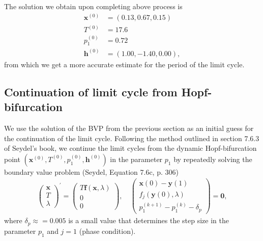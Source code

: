The solution we obtain upon completing above process is
\begin{align*}
    \mathbf{x}^{(0)} & = (0.13, 0.67, 0.15)\\
    T^{(0)} &= 17.6\\
    p_1^{(0)} & = 0.72 \\
    \mathbf{h}^{(0)} &= (1.00, -1.40 , 0.00),
\end{align*}
from which we get a more accurate estimate for the period of the limit cycle.

\subsection{Continuation of limit cycle from Hopf-bifurcation}
We use the solution of the BVP from the previous section as an initial guess for the continuation of the limit cycle.
Following the method outlined in section 7.6.3 of Seydel's book, we continue the limit cycles from the dynamic Hopf-bifurcation 
point $(\mathbf{x}^{(0)}, T^{(0)}, p_1^{(0)}, \mathbf{h}^{(0)})$ in the parameter $p_1$ by repeatedly solving the boundary value problem 
(Seydel, Equation 7.6c, p. 306)
\begin{align}
    \left(\begin{array}{c}
        \mathbf{x} \\
        T \\
        \lambda
        \end{array}\right)^{\prime}=\left(\begin{array}{c}
        T \mathbf{f}(\mathbf{x}, \lambda) \\
        0 \\
        0
        \end{array}\right), \quad\left(\begin{array}{c}
        \mathbf{x}(0)-\mathbf{y}(1) \\
        f_j(\mathbf{y}(0), \lambda) \\
        p_1^{(k+1)}-p_1^{(k)} - \delta_p
        \end{array}\right)=\mathbf{0} ,
\label{eq:continuation_system}
\end{align}
where $\delta_p \approx = 0.005$ is a small value that determines the step size in the parameter $p_1$ and $j=1$ (phase condition).

